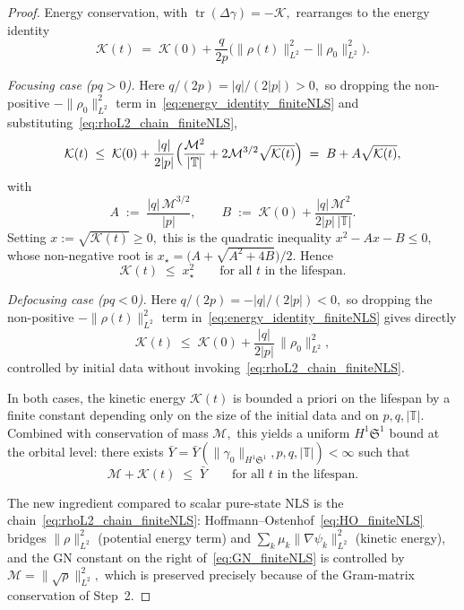 \documentclass[11pt]{amsart}
\theoremstyle{definition}
\newcommand{\T}{\mathbb{T}}
\newcommand{\Sp}{\mathfrak{S}}
\DeclareMathOperator{\tr}{tr}
\begin{document}
\begin{proof}
Energy conservation, with $\tr(\Delta\gamma)=-\mathcal{K},$ rearranges to the energy identity
\begin{equation}\label{eq:energy_identity_finiteNLS}
  \mathcal{K}(t)\;=\;\mathcal{K}(0)+\frac{q}{2p}\bigl(\|\rho(t)\|_{L^2}^2-\|\rho_0\|_{L^2}^2\bigr).
\end{equation}

\emph{Focusing case ($pq>0$).} Here $q/(2p)=|q|/(2|p|)>0,$ so dropping the non-positive $-\|\rho_0\|_{L^2}^2$ term in~\eqref{eq:energy_identity_finiteNLS} and substituting~\eqref{eq:rhoL2_chain_finiteNLS},
\[
  \mathcal{K}(t)
  \;\le\;\mathcal{K}(0)+\frac{|q|}{2|p|}\Bigl(\frac{\mathcal{M}^2}{|\T|}+2\mathcal{M}^{3/2}\sqrt{\mathcal{K}(t)}\Bigr)
  \;=\; B+A\sqrt{\mathcal{K}(t)},
\]
with
\[
  A\;:=\;\frac{|q|\,\mathcal{M}^{3/2}}{|p|},
  \qquad
  B\;:=\;\mathcal{K}(0)+\frac{|q|\,\mathcal{M}^2}{2|p|\,|\T|}.
\]
Setting $x:=\sqrt{\mathcal{K}(t)}\ge 0,$ this is the quadratic inequality $x^2-Ax-B\le 0,$ whose non-negative root is $x_\star=\bigl(A+\sqrt{A^2+4B}\bigr)/2.$ Hence
\begin{equation}\label{eq:apriori_finiteNLS_foc}
  \mathcal{K}(t)\;\le\;x_\star^2
  \qquad\text{for all }t\text{ in the lifespan.}
\end{equation}

\emph{Defocusing case ($pq<0$).} Here $q/(2p)=-|q|/(2|p|)<0,$ so dropping the non-positive $-\|\rho(t)\|_{L^2}^2$ term in~\eqref{eq:energy_identity_finiteNLS} gives directly
\begin{equation}\label{eq:apriori_finiteNLS_def}
  \mathcal{K}(t)\;\le\;\mathcal{K}(0)+\frac{|q|}{2|p|}\,\|\rho_0\|_{L^2}^2,
\end{equation}
controlled by initial data without invoking~\eqref{eq:rhoL2_chain_finiteNLS}.

In both cases, the kinetic energy $\mathcal{K}(t)$ is bounded a priori on the lifespan by a finite constant depending only on the size of the initial data and on $p,q,|\T|.$ Combined with conservation of mass $\mathcal{M},$ this yields a uniform $H^1\Sp^1$ bound at the orbital level: there exists $\bar Y=\bar Y(\|\gamma_0\|_{H^1\Sp^1},p,q,|\T|)<\infty$ such that
\begin{equation}\label{eq:Ybar_finiteNLS}
  \mathcal{M}+\mathcal{K}(t)\;\le\;\bar Y\qquad\text{for all }t\text{ in the lifespan.}
\end{equation}


The new ingredient compared to scalar pure-state NLS is the chain~\eqref{eq:rhoL2_chain_finiteNLS}: Hoffmann--Ostenhof~\eqref{eq:HO_finiteNLS} bridges $\|\rho\|_{L^2}^2$ (potential energy term) and $\sum_k\mu_k\|\nabla\psi_k\|_{L^2}^2$ (kinetic energy), and the GN constant on the right of~\eqref{eq:GN_finiteNLS} is controlled by $\mathcal{M}=\|\sqrt\rho\|_{L^2}^2,$ which is preserved precisely because of the Gram-matrix conservation of Step~2.



\end{proof}
\end{document}
